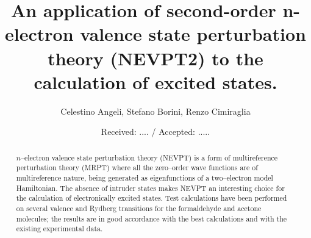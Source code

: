 \documentclass[global,referee]{svjour}
\begin{document}
 
\title{An application of second-order n-electron valence state perturbation
theory (NEVPT2) to the calculation of excited states.}

 
\author{Celestino Angeli, Stefano Borini, Renzo Cimiraglia}



\date{Received:  .... / Accepted: .....}
\dedication{Dedicated to Jacopo Tomasi, mentor and friend}
\maketitle


\begin{abstract}
$n$--electron valence state perturbation theory (NEVPT) is a form of
multireference perturbation theory (MRPT) where all the zero--order
wave functions are of multireference nature, being generated as
eigenfunctions of a two--electron model Hamiltonian. The absence of
intruder states makes NEVPT an interesting choice for the calculation
of electronically excited states. Test calculations have been
performed on several valence and Rydberg transitions for the
formaldehyde and acetone molecules; the results are in good accordance
with the best calculations and with the existing experimental data.
\end{abstract}
{\smallskip}
{\smallskip}
\end{document}
